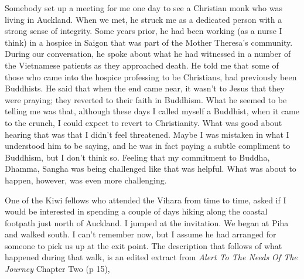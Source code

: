 Somebody set up a meeting for me one day to see a Christian monk who was
living in Auckland. When we met, he struck me as a dedicated person with
a strong sense of integrity. Some years prior, he had been working (as a
nurse I think) in a hospice in Saigon that was part of the Mother
Theresa's community. During our conversation, he spoke about what he had
witnessed in a number of the Vietnamese patients as they approached
death. He told me that some of those who came into the hospice
professing to be Christians, had previously been Buddhists. He said that
when the end came near, it wasn't to Jesus that they were praying; they
reverted to their faith in Buddhism. What he seemed to be telling me was
that, although these days I called myself a Buddhist, when it came to
the crunch, I could expect to revert to Christianity. What was good
about hearing that was that I didn't feel threatened. Maybe I was
mistaken in what I understood him to be saying, and he was in fact
paying a subtle compliment to Buddhism, but I don't think so. Feeling
that my commitment to Buddha, Dhamma, Sangha was being challenged like
that was helpful. What was about to happen, however, was even more
challenging.

One of the Kiwi fellows who attended the Vihara from time to time, asked
if I would be interested in spending a couple of days hiking along the
coastal footpath just north of Auckland. I jumped at the invitation. We
began at Piha\cite{piha} and walked south. I can't remember now, but I assume he had
arranged for someone to pick us up at the exit point. The description
that follows of what happened during that walk, is an edited extract
from \emph{Alert To The Needs Of The Journey}\cite{alert} Chapter Two (p 15),

